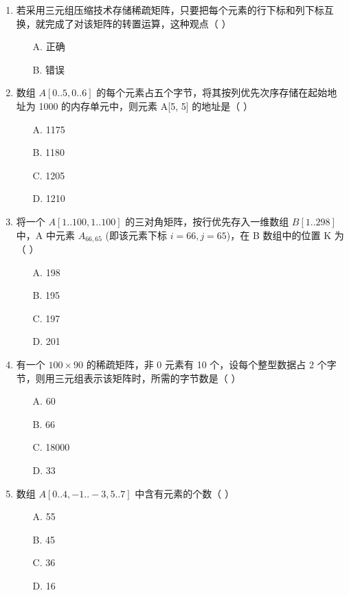 \documentclass[12pt, a4paper]{article}
\begin{document}
\begin{enumerate}[label=\arabic*.]
	\item 若采用三元组压缩技术存储稀疏矩阵，只要把每个元素的行下标和列下标互换，就完成了对该矩阵的转置运算，这种观点（ ）
	      \begin{enumerate}
		      \item[A.] 正确
		      \item[B.] 错误
	      \end{enumerate}

	\item 数组 $A[0..5, 0..6]$ 的每个元素占五个字节，将其按列优先次序存储在起始地址为 1000 的内存单元中，则元素 A[5, 5] 的地址是（ ）
	      \begin{enumerate}
		      \item[A.] 1175
		      \item[B.] 1180
		      \item[C.] 1205
		      \item[D.] 1210
	      \end{enumerate}

	\item 将一个 $A[1..100, 1..100]$ 的三对角矩阵，按行优先存入一维数组 $B[1..298]$ 中，A 中元素 $A_{66,65}$ (即该元素下标 $i=66, j=65$)，在 B 数组中的位置 K 为（ ）
	      \begin{enumerate}
		      \item[A.] 198
		      \item[B.] 195
		      \item[C.] 197
		      \item[D.] 201
	      \end{enumerate}

	\item 有一个 $100 \times 90$ 的稀疏矩阵，非 0 元素有 10 个，设每个整型数据占 2 个字节，则用三元组表示该矩阵时，所需的字节数是（ ）
	      \begin{enumerate}
		      \item[A.] 60
		      \item[B.] 66
		      \item[C.] 18000
		      \item[D.] 33
	      \end{enumerate}

	\item 数组 $A[0..4, -1..-3, 5..7]$ 中含有元素的个数（ ）
	      \begin{enumerate}
		      \item[A.] 55
		      \item[B.] 45
		      \item[C.] 36
		      \item[D.] 16
	      \end{enumerate}


\end{enumerate}
\end{document}
